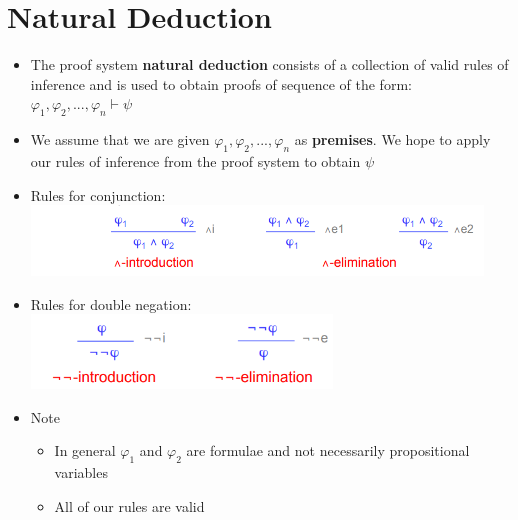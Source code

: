 \documentclass{article}[18pt]
\begin{document}
\section{Natural Deduction}
\begin{itemize}
\item The proof system \textbf{natural deduction} consists of a collection of valid rules of inference and is used to obtain proofs of sequence of the form:\\
$\varphi_1,\varphi_2,...,\varphi_n\vdash \psi$
\item We assume that we are given $\varphi_1,\varphi_2,...,\varphi_n$ as \textbf{premises}. We hope to apply our rules of inference from the proof system to obtain $\psi$
\item Rules for conjunction:\\
\includegraphics[width=12cm]{Conjunction.png}
\item Rules for double negation:\\
\includegraphics[width=8cm]{Negation.png}
\item Note
\begin{itemize}
\item In general $\varphi_1$ and $\varphi_2$ are formulae and not necessarily propositional variables
\item All of our rules are valid
\end{itemize}
\end{itemize}
\end{document}

